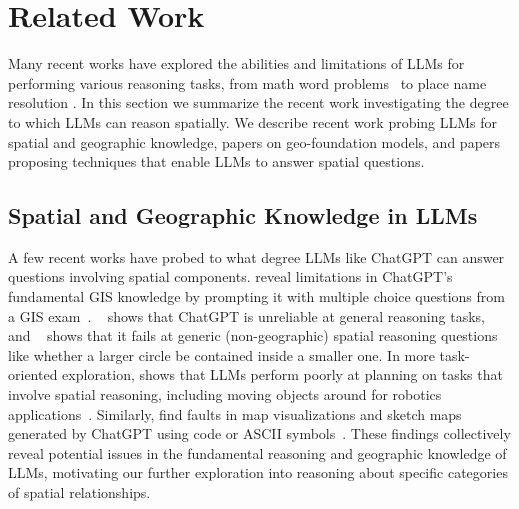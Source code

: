 \section{Related Work}
\label{section:related}
\normalsize

Many recent works have explored the abilities and limitations of LLMs for performing various reasoning tasks, from math word problems~\cite{Gao2023, Badaro2023} to place name resolution \cite{Mai2024}.
In this section we summarize the recent work investigating the degree to which LLMs can reason spatially.
We describe recent work probing LLMs for spatial and geographic knowledge, papers on geo-foundation models, and papers proposing techniques that enable LLMs to answer spatial questions.

\subsection{Spatial and Geographic Knowledge in LLMs}
A few recent works have probed to what degree LLMs like ChatGPT can answer questions involving spatial components.
\citeauthor{Mooney2023} reveal limitations in ChatGPT's fundamental GIS knowledge by prompting it with multiple choice questions from a GIS exam~\cite{Mooney2023}.
\citeauthor{Bang2023}~\cite{Bang2023} shows that ChatGPT is unreliable at general reasoning tasks, and
\citeauthor{Cohn2023}~\cite{Cohn2023} shows that it fails at generic (non-geographic) spatial reasoning questions like whether a larger circle be contained inside a smaller one.
In more task-oriented exploration, 
\citeauthor{Xie2023translating} shows that LLMs perform poorly at planning on tasks that involve spatial reasoning, including moving objects around for robotics applications~\cite{Xie2023translating}.
Similarly, 
\citeauthor{Tao2023} find faults in map visualizations and sketch maps generated by ChatGPT using code or ASCII symbols~\cite{Tao2023}.
These findings collectively reveal potential issues in the fundamental reasoning and geographic knowledge of LLMs, motivating our further exploration into reasoning about specific categories of spatial relationships.

